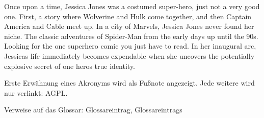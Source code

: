 Once upon a time, Jessica Jones was a costumed super-hero, just not a very good one.
First, a story where Wolverine and Hulk come together, and then Captain America and Cable meet up.
In a city of Marvels, Jessica Jones never found her niche. The classic adventures of Spider-Man from the early days up until the 90s.
Looking for the one superhero comic you just have to read. In her inaugural arc, Jessicas life immediately becomes expendable when she uncovers the potentially explosive secret of one heros true identity.

Erste Erwähnung eines Akronyms wird als Fußnote angezeigt. 
Jede weitere wird nur verlinkt: \acf{AGPL}. \cite{fsf:2007}

Verweise auf das Glossar: \gls{Glossareintrag}, \glspl{Glossareintrag}

